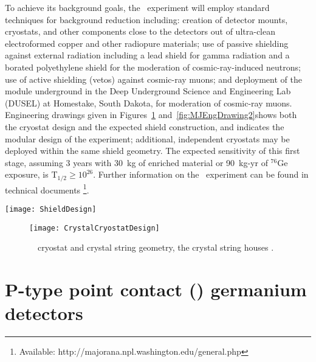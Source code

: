 To achieve its background goals, the \MJ~experiment will employ standard techniques for background reduction including: creation of detector mounts, cryostats, and other components close to the detectors out of ultra-clean electroformed copper and other radiopure materials; use of passive shielding against external radiation including a lead shield for gamma radiation and a borated polyethylene shield for the moderation of cosmic-ray-induced neutrons; use of active shielding (vetos) against cosmic-ray muons; and deployment of the module underground in the Deep Underground Science and Engineering Lab (DUSEL) at Homestake, South Dakota, for moderation of cosmic-ray muons.  Engineering drawings given in Figures~\ref{fig:MJEngDrawing1} and~\ref{fig:MJEngDrawing2}shows both the cryostat design and the expected shield construction, and indicates the modular design of the experiment; additional, independent cryostats may be deployed within the same shield geometry.  The expected sensitivity of this first stage, 
assuming 3 years with 30~kg of enriched material or 90~kg-yr of $^{76}$Ge
exposure, is T$_{1/2}\geq 10^{26}$.  Further information on the
\MJ~experiment can be found in technical documents \footnote{Available:
http://majorana.npl.washington.edu/general.php}. 

	
		\begin{sidewaysfigure}
			\centering		
			\def\figheight{0.45\textheight}
			\texttt{[image: ShieldDesign]}
			\caption[\MJ~\minmod~shield geometry]{\MJ~\minmod~shield geometry.  The modular design of the shield will 
			enable a phased deployment of cryostats, allowing detectors to be easily added after commission of the experiment.}
			\label{fig:MJEngDrawing2}
		\end{sidewaysfigure}
	
		\begin{figure}
			\centering		
			\def\figheight{0.45\textheight}
			\texttt{[image: CrystalCryostatDesign]}
			\caption[\MJ~\minmod~cryostat and crystal string geometry]{\MJ~\minmod~cryostat and crystal string geometry, the
			crystal string houses .}
			\label{fig:MJEngDrawing1}
		\end{figure}

	
	\section{P-type point contact (\ppc) germanium detectors}

